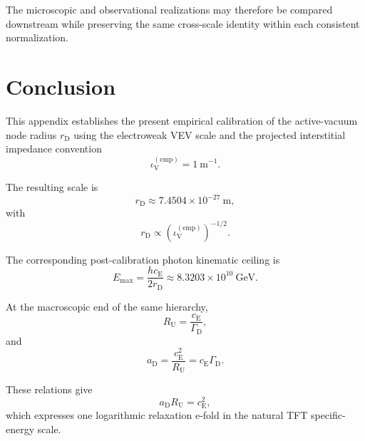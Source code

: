 The microscopic and observational realizations may therefore be compared
downstream while preserving the same cross-scale identity within each
consistent normalization.


\section{Conclusion}

This appendix establishes the present empirical calibration of the
active-vacuum node radius $r_{\mathrm D}$ using the electroweak VEV scale and
the projected interstitial impedance convention
\begin{equation}
    \iota_{\mathrm V}^{(\mathrm{emp})}
    =
    1~\mathrm{m^{-1}}.
\end{equation}

The resulting scale is
\begin{equation}
    \boxed{
    r_{\mathrm D}
    \approx
    7.4504\times10^{-27}~\mathrm m,
    }
\end{equation}
with
\begin{equation}
    r_{\mathrm D}
    \propto
    \left(
        \iota_{\mathrm V}^{(\mathrm{emp})}
    \right)^{-1/2}.
\end{equation}

The corresponding post-calibration photon kinematic ceiling is
\begin{equation}
    \boxed{
    E_{\mathrm{max}}
    =
    \frac{
        hc_{\mathrm E}
    }{
        2r_{\mathrm D}
    }
    \approx
    8.3203\times10^{10}~\mathrm{GeV}.
    }
\end{equation}

At the macroscopic end of the same hierarchy,
\begin{equation}
    R_{\mathrm U}
    =
    \frac{
        c_{\mathrm E}
    }{
        \Gamma_{\mathrm D}
    },
\end{equation}
and
\begin{equation}
    a_{\mathrm D}
    =
    \frac{
        c_{\mathrm E}^{2}
    }{
        R_{\mathrm U}
    }
    =
    c_{\mathrm E}\Gamma_{\mathrm D}.
\end{equation}

These relations give
\begin{equation}
    \boxed{
    a_{\mathrm D}R_{\mathrm U}
    =
    c_{\mathrm E}^{2},
    }
\end{equation}
which expresses one logarithmic relaxation e-fold in the natural TFT
specific-energy scale.

